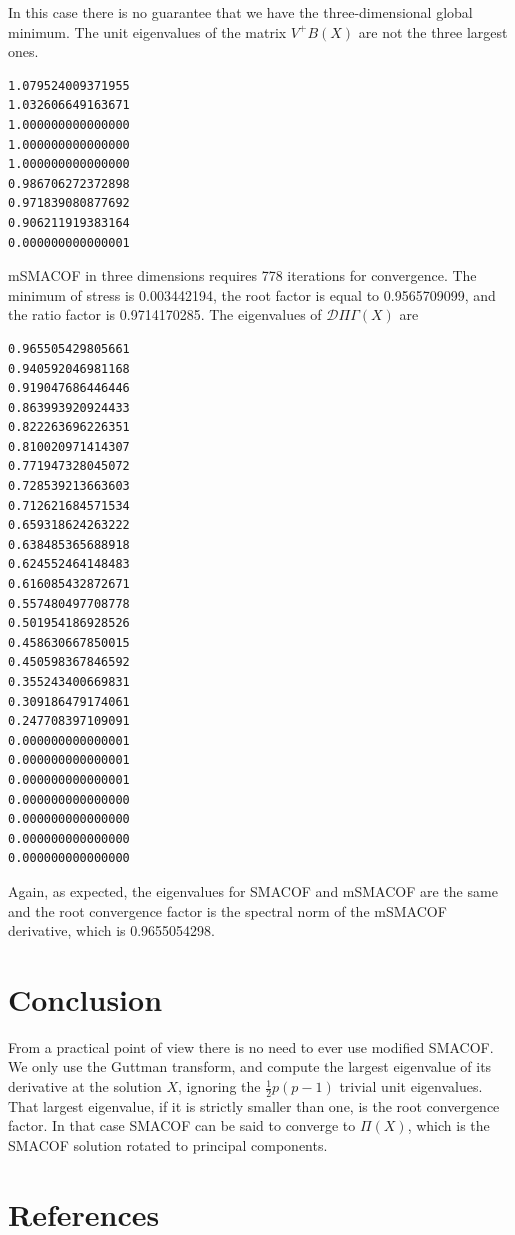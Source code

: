 \documentclass[
  12pt,
  letterpaper,
  DIV=11,
  numbers=noendperiod]{scrartcl}
\newcommand{\sectionbreak}{\clearpage}
\begin{document}
In this case there is no guarantee that we have the three-dimensional
global minimum. The unit eigenvalues of the matrix \(V^+B(X)\) are not
the three largest ones.

\begin{verbatim}
1.079524009371955 
1.032606649163671 
1.000000000000000 
1.000000000000000 
1.000000000000000 
0.986706272372898 
0.971839080877692 
0.906211919383164 
0.000000000000001 
\end{verbatim}

mSMACOF in three dimensions requires 778 iterations for convergence. The
minimum of stress is 0.003442194, the root factor is equal to
0.9565709099, and the ratio factor is 0.9714170285. The eigenvalues of
\(\mathcal{D}\Pi\Gamma(X)\) are

\begin{verbatim}
0.965505429805661 
0.940592046981168 
0.919047686446446 
0.863993920924433 
0.822263696226351 
0.810020971414307 
0.771947328045072 
0.728539213663603 
0.712621684571534 
0.659318624263222 
0.638485365688918 
0.624552464148483 
0.616085432872671 
0.557480497708778 
0.501954186928526 
0.458630667850015 
0.450598367846592 
0.355243400669831 
0.309186479174061 
0.247708397109091 
0.000000000000001 
0.000000000000001 
0.000000000000001 
0.000000000000000 
0.000000000000000 
0.000000000000000 
0.000000000000000 
\end{verbatim}

Again, as expected, the eigenvalues for SMACOF and mSMACOF are the same
and the root convergence factor is the spectral norm of the mSMACOF
derivative, which is 0.9655054298.

\section{Conclusion}\label{conclusion}

From a practical point of view there is no need to ever use modified
SMACOF. We only use the Guttman transform, and compute the largest
eigenvalue of its derivative at the solution \(X\), ignoring the
\(\frac12 p(p-1)\) trivial unit eigenvalues. That largest eigenvalue, if
it is strictly smaller than one, is the root convergence factor. In that
case SMACOF can be said to converge to \(\Pi(X)\), which is the SMACOF
solution rotated to principal components.

\sectionbreak

\section*{References}\label{references}
\end{document}
